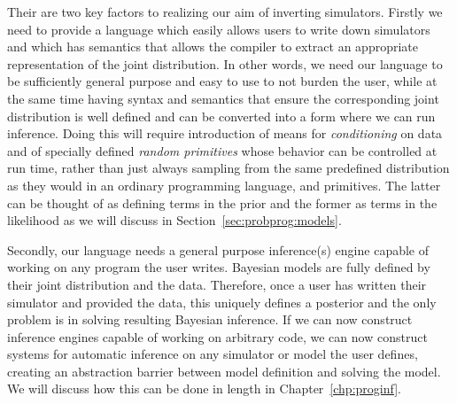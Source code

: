 Their are two key factors to realizing our aim of inverting simulators.  Firstly we need to provide a 
language which easily allows users to
write down simulators and which has semantics that allows the compiler to extract an appropriate
representation of the joint distribution.  In other words, we need our language to be sufficiently
general purpose and easy to use to not burden the user, while at the same time having syntax and semantics that
ensure the corresponding joint distribution is well defined and can be converted into a form where
we can run inference.  Doing this will require introduction of means for \emph{conditioning} on data
and of specially defined \emph{random primitives} whose behavior can be controlled at 
run time, rather than just always sampling from
the same predefined distribution as they would in an ordinary programming language, and primitives.  
The latter can be thought of as defining terms in the prior and the
former as terms in the likelihood as we will discuss in Section~\ref{sec:probprog:models}.

Secondly, our language needs a general purpose inference(s)
engine capable of working on any program the user writes.  Bayesian models are fully defined
by their joint distribution and the data.  Therefore, once a user has written their simulator and provided
the data, this uniquely defines a posterior and the only problem is in solving resulting Bayesian inference.
If we can now construct inference engines capable of working on arbitrary code, we can now 
construct systems for automatic inference on any simulator or model the user defines, creating an
abstraction barrier between model definition and solving the model.  We will discuss how this can be
done in length in Chapter~\ref{chp:proginf}.

